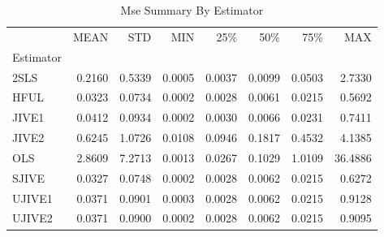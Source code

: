 \begin{table}[ht]
\centering
\caption{Mse Summary By Estimator}
\begin{tabular}{lrrrrrrr}
\toprule
 & MEAN & STD & MIN & 25\% & 50\% & 75\% & MAX \\
Estimator &  &  &  &  &  &  &  \\
\midrule
2SLS & 0.2160 & 0.5339 & 0.0005 & 0.0037 & 0.0099 & 0.0503 & 2.7330 \\
HFUL & 0.0323 & 0.0734 & 0.0002 & 0.0028 & 0.0061 & 0.0215 & 0.5692 \\
JIVE1 & 0.0412 & 0.0934 & 0.0002 & 0.0030 & 0.0066 & 0.0231 & 0.7411 \\
JIVE2 & 0.6245 & 1.0726 & 0.0108 & 0.0946 & 0.1817 & 0.4532 & 4.1385 \\
OLS & 2.8609 & 7.2713 & 0.0013 & 0.0267 & 0.1029 & 1.0109 & 36.4886 \\
SJIVE & 0.0327 & 0.0748 & 0.0002 & 0.0028 & 0.0062 & 0.0215 & 0.6272 \\
UJIVE1 & 0.0371 & 0.0901 & 0.0003 & 0.0028 & 0.0062 & 0.0215 & 0.9128 \\
UJIVE2 & 0.0371 & 0.0900 & 0.0002 & 0.0028 & 0.0062 & 0.0215 & 0.9095 \\
\bottomrule
\end{tabular}
\end{table}
